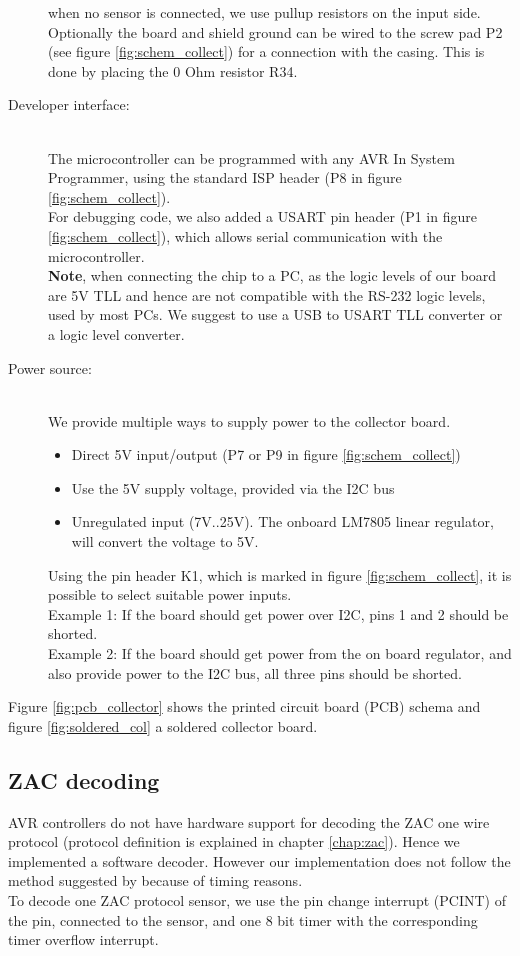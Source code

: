 \documentclass[a4paper]{scrreprt}
\begin{document}
\begin{description}
    when no sensor is connected, we use pullup resistors on the
    input side. Optionally the board and shield ground can be wired to
    the screw pad P2 (see figure \ref{fig:schem_collect}) for a connection with the casing. This is done by
    placing the 0 Ohm resistor R34.
  \item[Developer interface:]\hspace{1cm}\\
    The microcontroller can be programmed with any AVR In System
    Programmer, using the standard ISP header (P8 in figure \ref{fig:schem_collect}).\\
    For debugging code, we also added a USART pin header (P1 in figure \ref{fig:schem_collect}), which
    allows serial communication with the microcontroller. 
    \\
    \textbf{Note}, when connecting the chip to a PC, as the logic
    levels of our board are 5V TLL and hence are not compatible
    with the RS-232 logic levels, used by most PCs. We suggest to use
    a USB to USART TLL converter or a logic level converter.
  \item[Power source:]\hspace{1cm}\\
    We provide multiple ways to supply power to the collector board.
    \begin{itemize}
      \item Direct 5V input/output (P7 or P9 in figure \ref{fig:schem_collect})
      \item Use the 5V supply voltage, provided via the I2C bus
      \item Unregulated input (7V..25V). The onboard LM7805 linear
        regulator, will convert the voltage to 5V.
    \end{itemize}
    Using the pin header K1, which is marked in figure \ref{fig:schem_collect}, it is possible to select suitable
    power inputs.\\
    Example 1: If the board should get power over I2C, pins 1 and 2
    should be shorted.\\
    Example 2: If the board should get power from the on board
    regulator, and also provide power to the I2C bus, all three pins
    should be shorted.
\end{description}
Figure \ref{fig:pcb_collector} shows the printed circuit board (PCB) schema and figure \ref{fig:soldered_col} a soldered collector board.
\subsection{ZAC decoding}
AVR controllers do not have hardware support for decoding the ZAC one wire
protocol (protocol definition is explained in chapter \ref{chap:zac}). Hence we
implemented a software decoder. However our implementation
does not follow the method suggested by \cite{zac} because of timing reasons.\\
To decode one ZAC protocol sensor, we use the pin change interrupt (PCINT) of the pin, connected to the sensor, and
one 8 bit timer with the corresponding timer overflow interrupt.
\end{document}
